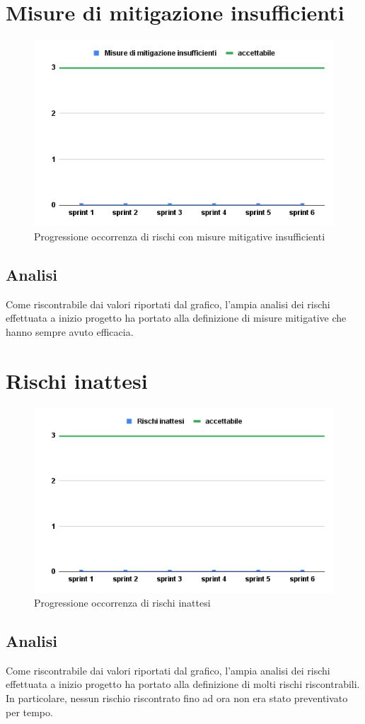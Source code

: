 \section{Misure di mitigazione insufficienti}
\begin{figure}[H]
    \centering
    \includegraphics[width=0.8\linewidth]{Mitigazioni.png}
    \caption{Progressione occorrenza di rischi con misure mitigative insufficienti}
\end{figure}
\subsection{Analisi}
Come riscontrabile dai valori riportati dal grafico, l'ampia analisi dei rischi effettuata a inizio progetto ha portato alla definizione di misure mitigative che hanno sempre avuto efficacia.

\section{Rischi inattesi}
\begin{figure}[H]
    \centering
    \includegraphics[width=0.8\linewidth]{Rischi.png}
    \caption{Progressione occorrenza di rischi inattesi}
\end{figure}
\subsection{Analisi}
Come riscontrabile dai valori riportati dal grafico, l'ampia analisi dei rischi effettuata a inizio progetto ha portato alla definizione di molti rischi riscontrabili. In particolare, nessun rischio riscontrato fino ad ora non era stato preventivato per tempo.

